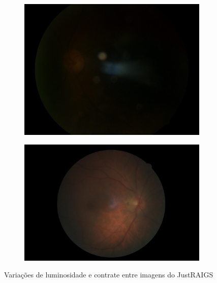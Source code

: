 \documentclass[12pt]{article}
\begin{document}
\begin{figure}
\begin{subfigure}[b]{0.2\textwidth}
        \label{fig:images_variations_1_2}
    \end{subfigure}
    \hfill
    \begin{subfigure}[b]{0.2\textwidth}
        \centering
        \includegraphics[width=\textwidth]{images/examples_from_dataset/TRAIN013211.JPG}
        \label{fig:images_variations_1_3}
    \end{subfigure}
    \hfill
    \begin{subfigure}[b]{0.2\textwidth}
        \centering
        \includegraphics[width=\textwidth]{images/examples_from_dataset/TRAIN061871.JPG}
        \label{fig:images_variations_1_4}
    \end{subfigure}
    \caption{Variações de luminosidade e contrate entre imagens do JustRAIGS}
    \label{fig:images_variations_1}
\end{figure}
\end{document}
